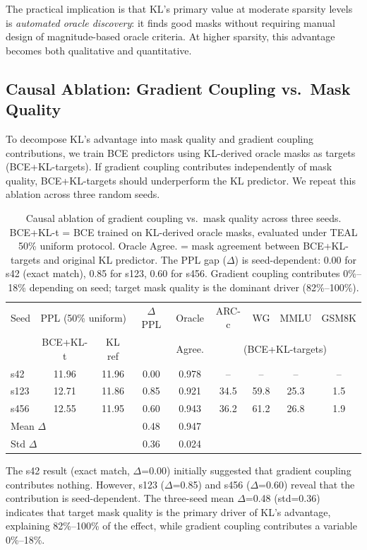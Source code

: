 \documentclass[11pt,a4paper]{article}
\begin{document}
The practical implication is that KL's primary value at moderate sparsity levels is \emph{automated oracle discovery}: it finds good masks without requiring manual design of magnitude-based oracle criteria. At higher sparsity, this advantage becomes both qualitative and quantitative.

\subsection{Causal Ablation: Gradient Coupling vs.\ Mask Quality}
\label{sec:c1-ablation}

To decompose KL's advantage into mask quality and gradient coupling contributions, we train BCE predictors using KL-derived oracle masks as targets (BCE+KL-targets). If gradient coupling contributes independently of mask quality, BCE+KL-targets should underperform the KL predictor. We repeat this ablation across three random seeds.

\begin{table}[h]
\centering
\small
\begin{tabular}{lcccccccc}
\toprule
Seed & \multicolumn{2}{c}{PPL (50\% uniform)} & $\Delta$ PPL & Oracle & ARC-c & WG & MMLU & GSM8K \\
 & BCE+KL-t & KL ref & & Agree. & \multicolumn{4}{c}{(BCE+KL-targets)} \\
\midrule
s42 & 11.96 & 11.96 & 0.00 & 0.978 & -- & -- & -- & -- \\
s123 & 12.71 & 11.86 & 0.85 & 0.921 & 34.5 & 59.8 & 25.3 & 1.5 \\
s456 & 12.55 & 11.95 & 0.60 & 0.943 & 36.2 & 61.2 & 26.8 & 1.9 \\
\midrule
\multicolumn{2}{l}{Mean $\Delta$} & & 0.48 & 0.947 & & & & \\
\multicolumn{2}{l}{Std $\Delta$} & & 0.36 & 0.024 & & & & \\
\bottomrule
\end{tabular}
\caption{Causal ablation of gradient coupling vs.\ mask quality across three seeds. BCE+KL-t = BCE trained on KL-derived oracle masks, evaluated under TEAL 50\% uniform protocol. Oracle Agree. = mask agreement between BCE+KL-targets and original KL predictor. The PPL gap ($\Delta$) is seed-dependent: 0.00 for s42 (exact match), 0.85 for s123, 0.60 for s456. Gradient coupling contributes 0\%--18\% depending on seed; target mask quality is the dominant driver (82\%--100\%).}
\label{tab:c1-ablation}
\end{table}

The s42 result (exact match, $\Delta$=0.00) initially suggested that gradient coupling contributes nothing. However, s123 ($\Delta$=0.85) and s456 ($\Delta$=0.60) reveal that the contribution is seed-dependent. The three-seed mean $\Delta$=0.48 (std=0.36) indicates that target mask quality is the primary driver of KL's advantage, explaining 82\%--100\% of the effect, while gradient coupling contributes a variable 0\%--18\%.
\end{document}
